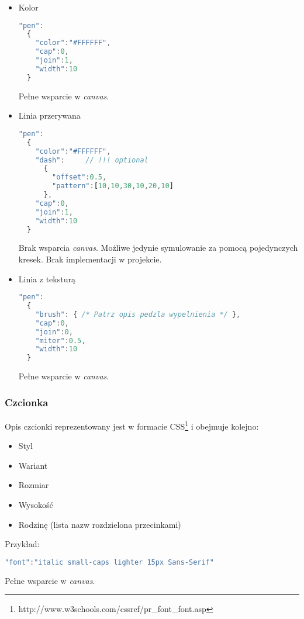 \begin{itemize}
\item Kolor
\begin{lstlisting}[language=JavaScript,numbers=none]
"pen":
  {
    "color":"#FFFFFF",
    "cap":0,
    "join":1,
    "width":10
  }
\end{lstlisting}
Pełne wsparcie w \emph{canvas}.

\item Linia przerywana
\begin{lstlisting}[language=JavaScript,numbers=none]
"pen":
  {
    "color":"#FFFFFF",
    "dash":		// !!! optional
      {
        "offset":0.5,
        "pattern":[10,10,30,10,20,10]
      },
    "cap":0,
    "join":1,
    "width":10
  }
\end{lstlisting}
Brak wsparcia \emph{canvas}. Możliwe jedynie symulowanie za pomocą pojedynczych kresek. Brak implementacji w projekcie.

\item Linia z teksturą
\begin{lstlisting}[language=JavaScript,numbers=none]
"pen":
  {
    "brush": { /* Patrz opis pedzla wypelnienia */ },
    "cap":0,
    "join":0,
    "miter":0.5,
    "width":10
  }
\end{lstlisting}
Pełne wsparcie w \emph{canvas}.

\end{itemize}

\subsubsection{Czcionka}
Opis czcionki reprezentowany jest w formacie CSS\footnote{http://www.w3schools.com/cssref/pr\_font\_font.asp} i obejmuje kolejno:
\begin{itemize}
\item Styl
\item Wariant
\item Rozmiar
\item Wysokość
\item Rodzinę (lista nazw rozdzielona przecinkami)
\end{itemize}

Przykład:
\begin{lstlisting}[language=JavaScript,numbers=none]
"font":"italic small-caps lighter 15px Sans-Serif"
\end{lstlisting}

Pełne wsparcie w \emph{canvas}. 

